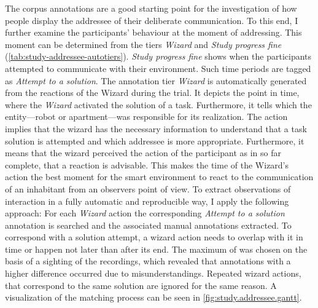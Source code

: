The corpus annotations are a good starting point for the investigation of how people display the \gls{addressee} of their deliberate communication.
To this end, I further examine the participants' behaviour at the moment of addressing.
This moment can be determined from the tiers \emph{Wizard} and \emph{Study progress fine} (\cref{tab:study-addressee-autotiers}).
\emph{Study progress fine} shows when the participants attempted to communicate with their environment.
Such time periods are tagged as \emph{Attempt to a solution}.
The annotation tier \emph{Wizard} is automatically generated from the reactions of the Wizard during the trial.
It depicts the point in time, where the \emph{Wizard} activated the solution of a task.
Furthermore, it tells which the entity---\gls{robot} or \gls{apartment}---was responsible for its realization.
The action implies that the \gls{wizard} has the necessary information to understand that a task solution is attempted and which \gls{addressee} is more appropriate.
Furthermore, it means that the \gls{wizard} perceived the action of the participant as in so far complete, that a reaction is advisable.
This makes the time of the Wizard's action the best moment for the \gls{smart environment} to react to the communication of an inhabitant from an observers point of view.
To extract observations of interaction in a fully automatic and reproducible way, I apply the following approach:
For each \emph{Wizard} action the corresponding \emph{Attempt to a solution} annotation is searched and the associated manual annotations extracted.
To correspond with a solution attempt, a \gls{wizard} action needs to overlap with it in time or happen not later than  after its end.
The maximum of  was chosen on the basis of a sighting of the recordings, which revealed that annotations with a higher difference occurred due to misunderstandings.
Repeated \gls{wizard} actions, that correspond to the same solution are ignored for the same reason.
A visualization of the matching process can be seen in \cref{fig:study.addressee.gantt}.
